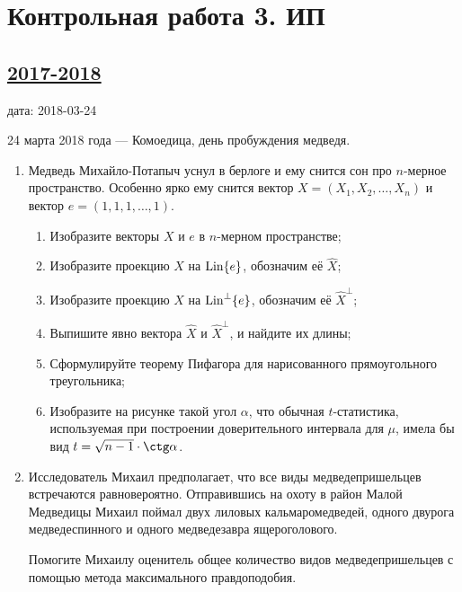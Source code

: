 \newpage
\thispagestyle{empty}
\section{Контрольная работа 3. ИП}


\subsection[2017-2018]{\hyperref[sec:sol_kr_03_ip_2017_2018]{2017-2018}}
\label{sec:kr_03_ip_2017_2018}

дата: 2018-03-24

24 марта 2018 года — Комоедица, день пробуждения медведя.

\begin{enumerate}
\item Медведь Михайло-Потапыч уснул в берлоге и ему снится сон про $n$-мерное пространство.
Особенно ярко ему снится вектор $X=(X_1, X_2, \ldots, X_n)$ и вектор $e=(1, 1, 1, \ldots, 1)$.
\begin{enumerate}
\item Изобразите векторы $X$ и $e$ в $n$-мерном пространстве;
\item Изобразите проекцию $X$ на $\operatorname{\mathrm{Lin}} \{e\}$, обозначим её $\hat X$;
\item Изобразите проекцию $X$ на $\operatorname{\operatorname{\mathrm{Lin}}^{\perp}} \{e\}$, обозначим её $\hat X^{\perp}$;
\item Выпишите явно вектора $\hat X$ и $\hat X^{\perp}$, и найдите их длины;
\item Сформулируйте теорему Пифагора для нарисованного прямоугольного треугольника;
\item Изобразите на рисунке такой угол $\alpha$, что обычная $t$-статистика,
используемая при построении доверительного интервала для $\mu$, имела бы вид
$t = \sqrt{n-1} \cdot \ctg \alpha$.
\end{enumerate}

\item Исследователь Михаил предполагает, что все виды медведепришельцев встречаются
равновероятно. Отправившись на охоту в район Малой Медведицы Михаил поймал двух
лиловых кальмаромедведей, одного двурога медведеспинного и одного медведезавра
ящероголового.

Помогите Михаилу оценитель общее количество видов медведепришельцев с помощью метода
максимального правдоподобия.


\end{enumerate}

